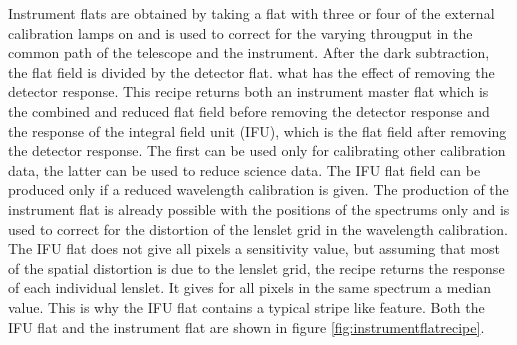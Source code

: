 \documentclass[twoside,single]{lion-msc}
\begin{document}
Instrument flats are obtained by taking a flat with three or four of the external calibration lamps on and is used to correct for the varying througput in the common path of the telescope and the instrument. After the dark subtraction, the flat field is divided by the detector flat. what has the effect of removing the detector response. This recipe returns both an instrument master flat which is the combined and reduced flat field before removing the detector response and the response of the integral field unit (IFU), which is the flat field after removing the detector response. The first can be used only for calibrating other calibration data, the latter can be used to reduce science data. The IFU flat field can be produced only if a reduced wavelength calibration is given. The production of the instrument flat is already possible with the positions of the spectrums only and is used to correct for the distortion of the lenslet grid in the wavelength calibration. The IFU flat does not give all pixels a sensitivity value, but assuming that most of the spatial distortion is due to the lenslet grid, the recipe returns the response of each individual lenslet. It gives for all pixels in the same spectrum a median value. This is why the IFU flat contains a typical stripe like feature. Both the IFU flat and the instrument flat are shown in figure \ref{fig:instrumentflatrecipe}. 
\end{document}

